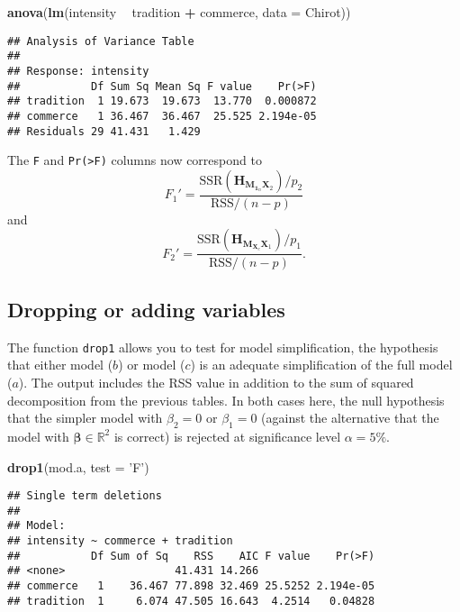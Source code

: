 \documentclass[]{book}
\newenvironment{Shaded}{\begin{snugshade}}{\end{snugshade}}
\newcommand{\DataTypeTok}[1]{\textcolor[rgb]{0.13,0.29,0.53}{#1}}
\newcommand{\KeywordTok}[1]{\textcolor[rgb]{0.13,0.29,0.53}{\textbf{#1}}}
\newcommand{\NormalTok}[1]{#1}
\newcommand{\OperatorTok}[1]{\textcolor[rgb]{0.81,0.36,0.00}{\textbf{#1}}}
\newcommand{\StringTok}[1]{\textcolor[rgb]{0.31,0.60,0.02}{#1}}
\theoremstyle{definition}
\theoremstyle{definition}
\theoremstyle{definition}
\theoremstyle{remark}
\begin{document}
\begin{Shaded}
\begin{Highlighting}[]
\KeywordTok{anova}\NormalTok{(}\KeywordTok{lm}\NormalTok{(intensity }\OperatorTok{~}\StringTok{ }\NormalTok{tradition }\OperatorTok{+}\StringTok{ }\NormalTok{commerce, }\DataTypeTok{data =}\NormalTok{ Chirot))}
\end{Highlighting}
\end{Shaded}

\begin{verbatim}
## Analysis of Variance Table
## 
## Response: intensity
##           Df Sum Sq Mean Sq F value    Pr(>F)
## tradition  1 19.673  19.673  13.770  0.000872
## commerce   1 36.467  36.467  25.525 2.194e-05
## Residuals 29 41.431   1.429
\end{verbatim}

The \texttt{F} and \texttt{Pr(\textgreater{}F)} columns now correspond
to
\[F_1' = \frac{\mathrm{SSR}(\mathbf{H}_{\mathbf{M}_{\mathbf{1}_n}\mathbf{X}_2})/p_2}{\mathrm{RSS}/(n-p)}\]
and
\[F_2' = \frac{\mathrm{SSR}(\mathbf{H}_{\mathbf{M}_{\mathbf{X}_c}\mathbf{X}_1})/p_1}{\mathrm{RSS}/(n-p)}.\]

\hypertarget{dropping-or-adding-variables}{%
\subsection{Dropping or adding
variables}\label{dropping-or-adding-variables}}

The function \texttt{drop1} allows you to test for model simplification,
the hypothesis that either model (\(b\)) or model (\(c\)) is an adequate
simplification of the full model (\(a\)). The output includes the RSS
value in addition to the sum of squared decomposition from the previous
tables. In both cases here, the null hypothesis that the simpler model
with \(\beta_2=0\) or \(\beta_1=0\) (against the alternative that the
model with \(\boldsymbol{\beta} \in \mathbb{R}^2\) is correct) is
rejected at significance level \(\alpha = 5\%\).

\begin{Shaded}
\begin{Highlighting}[]
\KeywordTok{drop1}\NormalTok{(mod.a, }\DataTypeTok{test =} \StringTok{'F'}\NormalTok{)}
\end{Highlighting}
\end{Shaded}

\begin{verbatim}
## Single term deletions
## 
## Model:
## intensity ~ commerce + tradition
##           Df Sum of Sq    RSS    AIC F value    Pr(>F)
## <none>                 41.431 14.266                  
## commerce   1    36.467 77.898 32.469 25.5252 2.194e-05
## tradition  1     6.074 47.505 16.643  4.2514   0.04828
\end{verbatim}
\end{document}
